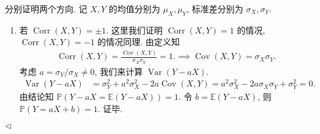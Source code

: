 \documentclass[11pt]{article}
\newtheorem{lemma}[theorem]{Lemma}
\newenvironment{answer}[1][Solution]{\begin{trivlist}
    \item[\hskip \labelsep {\bfseries #1.}\hskip \labelsep]}{\hfill$\lhd$\end{trivlist}}
\newcommand\1{\mathds{1}}
\newcommand\R{\mathbb{R}}
\newcommand\E{\mathbb{E}}
\newcommand\PP{\mathbb{P}}
\DeclareMathOperator{\Var}{Var}
\DeclareMathOperator{\Cov}{Cov}
\DeclareMathOperator{\Corr}{Corr}
\begin{document}
\begin{answer}
    分别证明两个方向. 记 $X,Y$ 的均值分别为 $\mu_X, \mu_Y$, 标准差分别为 $\sigma_X, \sigma_Y$.
    \begin{enumerate}[label=(\arabic*)]
        \item 若 $\Corr(X,Y) = \pm 1$. 这里我们证明 $\Corr(X,Y) = 1$ 的情况, $\Corr(X,Y) = -1$ 的情况同理. 由定义知
        \begin{align*}
            \Corr(X,Y) = \frac{\Cov(X,Y)}{ \sigma_X \sigma_Y} = 1. \implies \Cov(X,Y) = \sigma_X \sigma_Y.
        \end{align*}
        考虑 $a = \sigma_Y / \sigma_X \neq 0$, 我们来计算 $\Var(Y-aX)$.
        \begin{align*}
            \Var(Y-aX) &= \sigma_Y^2 + a^2 \sigma_X^2 - 2a\Cov(X,Y) = a^2 \sigma_X^2 - 2a\sigma_X\sigma_Y + \sigma_Y^2 = 0.
        \end{align*}
        由结论知 $\PP(Y-aX = \E(Y-aX)) = 1$. 令 $b = \E(Y-aX)$, 则 $\PP(Y = aX + b) = 1$. 证毕.


\end{enumerate}
\end{answer}
\end{document}
